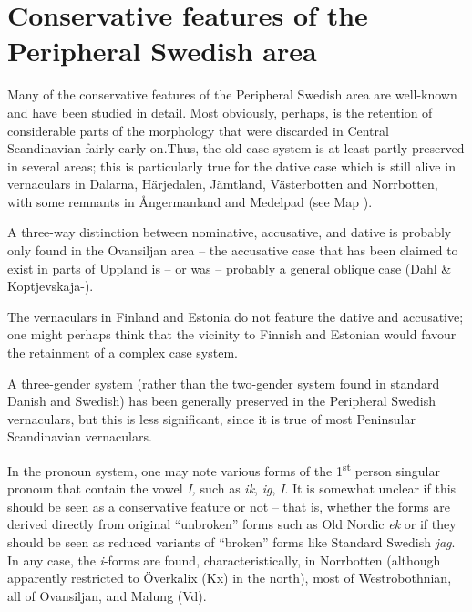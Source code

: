 \section{\rmfamily\bfseries Conservative features of the Peripheral Swedish area}

\begin{styleBodyTextFirst}
Many of the conservative features of the Peripheral Swedish area are well-known and have been studied in detail. Most obviously, perhaps, is the retention of considerable parts of the morphology that were discarded in Central Scandinavian fairly early on.Thus, the old case system is at least partly preserved in several areas; this is particularly true for the dative case which is still alive in vernaculars in Dalarna, Härjedalen, Jämtland, Västerbotten and Norrbotten, with some remnants in Ångermanland and Medelpad (see Map ). 

\end{styleBodyTextFirst}

\begin{styleBodytextC}
A three-way distinction between nominative, accusative, and dative is probably only found in the Ovansiljan area – the accusative case that has been claimed to exist in parts of Uppland is – or was – probably a general oblique case (Dahl \& Koptjevskaja-\citet{Tamm2006}). 

\end{styleBodytextC}

\begin{styleBodytextC}
The vernaculars in Finland and Estonia do not feature the dative and accusative; one might perhaps think that the vicinity to Finnish and Estonian would favour the retainment of a complex case system. 

\end{styleBodytextC}

\begin{styleBodytextC}
A three-gender system (rather than the two-gender system found in standard Danish and Swedish) has been generally preserved in the Peripheral Swedish vernaculars, but this is less significant, since it is true of most Peninsular Scandinavian vernaculars. 

\end{styleBodytextC}

\begin{styleBodytextC}
In the pronoun system, one may note various forms of the 1\textsuperscript{st} person singular pronoun that contain the vowel \textit{I, }such as \textit{ik}, \textit{ig}, \textit{I}.\textit{ }It is somewhat unclear if this should be seen as a conservative feature or not – that is, whether the forms are derived directly from original “unbroken” forms such as Old Nordic \textit{ek }or if they should be seen as reduced variants of “broken” forms like Standard Swedish \textit{jag}. In any case, the \textit{i}{}-forms are found, characteristically, in Norrbotten (although apparently restricted to Överkalix (Kx) in the north), most of Westrobothnian, all of Ovansiljan, and Malung (Vd). 

\end{styleBodytextC}

